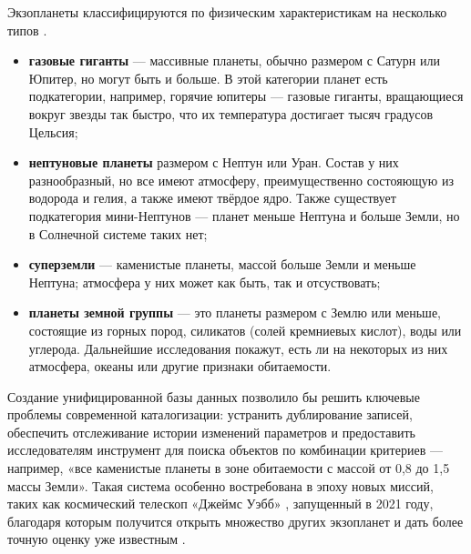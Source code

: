 \documentclass[14pt,a4paper]{extarticle}
\begin{document}
	Экзопланеты классифицируются по физическим характеристикам на несколько типов \cite{exoTypes}.%
	\label{types}
	\begin{itemize}
		\item \textbf{газовые гиганты} --- массивные планеты, обычно размером с Сатурн или Юпитер, но могут быть и больше. В этой категории планет есть подкатегории, например, горячие юпитеры --- газовые гиганты, вращающиеся вокруг звезды так быстро, что их температура достигает тысяч градусов Цельсия;
		\item \textbf{нептуновые планеты} размером с Нептун или Уран. Состав у них разнообразный, но все имеют атмосферу, преимущественно состояющую из водорода и гелия, а также имеют твёрдое ядро. Также существует подкатегория мини-Нептунов --- планет меньше Нептуна и больше Земли, но в Солнечной системе таких нет;
		\item \textbf{суперземли} --- каменистые планеты, массой больше Земли и меньше Нептуна; атмосфера у них может как быть, так и отсуствовать; 
		\item \textbf{планеты земной группы} --- это планеты размером с Землю или меньше, состоящие из горных пород, силикатов (солей кремниевых кислот), воды или углерода. Дальнейшие исследования покажут, есть ли на некоторых из них атмосфера, океаны или другие признаки обитаемости.
	\end{itemize}
	
	Создание унифицированной базы данных позволило бы решить ключевые проблемы современной каталогизации: устранить дублирование записей, обеспечить отслеживание истории изменений параметров и предоставить исследователям инструмент для поиска объектов по комбинации критериев — например, «все каменистые планеты в зоне обитаемости с массой от 0,8 до 1,5 массы Земли». Такая система особенно востребована в эпоху новых миссий, таких как космический телескоп «Джеймс Уэбб» \cite{webb}, запущенный в 2021 году, благодаря которым получится открыть множество других экзопланет и дать более точную оценку уже известным \cite{methods}.
	
\end{document}

